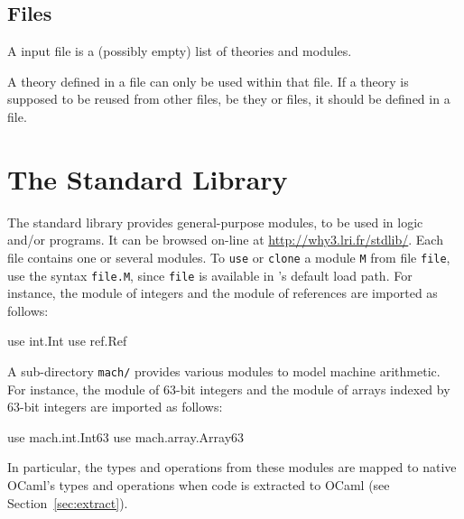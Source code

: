 \subsection{Files}

A \whyml input file is a (possibly empty) list of theories and modules.
\begin{center}\framebox{}\end{center}
A theory defined in a \whyml file can only be used within that
file. If a theory is supposed to be reused from other files, be they
\why or \whyml files, it should be defined in a \why file.


\section{The \why Standard Library}
\label{sec:library}

The \why standard library provides general-purpose
modules, to be used in logic and/or programs.
It can be browsed on-line at \url{http://why3.lri.fr/stdlib/}.
Each file contains one or several modules.
To \texttt{use} or \texttt{clone} a module \texttt{M} from file
\texttt{file}, use the syntax \texttt{file.M}, since \texttt{file} is
available in \why's default load path. For instance, the module of
integers and the module of references are imported as follows:
\begin{whycode}
  use int.Int
  use ref.Ref
\end{whycode}
A sub-directory \texttt{mach/} provides various modules to model
machine arithmetic.
For instance, the module of 63-bit integers and the module of arrays
indexed by 63-bit integers are imported as follows:
\begin{whycode}
  use mach.int.Int63
  use mach.array.Array63
\end{whycode}
In particular, the types and operations from these modules are mapped
to native OCaml's types and operations when \why code is extracted to
OCaml (see Section~\ref{sec:extract}).

